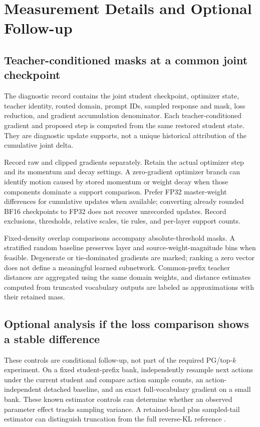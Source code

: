 \section{Measurement Details and Optional Follow-up}

\subsection{Teacher-conditioned masks at a common joint checkpoint}
\label{app:records}

The diagnostic record contains the joint student checkpoint, optimizer
state, teacher identity, routed domain, prompt IDs, sampled response
and mask, loss reduction, and gradient accumulation denominator.
Each teacher-conditioned gradient and proposed step is computed from
the same restored student state. They are diagnostic update supports,
not a unique historical attribution of the cumulative joint delta.

Record raw and clipped gradients separately. Retain the actual optimizer
step and its momentum and decay settings. A zero-gradient optimizer
branch can identify motion caused by stored momentum or weight decay
when those components dominate a support comparison. Prefer FP32
master-weight differences for cumulative updates when available;
converting already rounded BF16 checkpoints to FP32 does not recover
unrecorded updates. Record exclusions, thresholds, relative scales,
tie rules, and per-layer support counts.

Fixed-density overlap comparisons accompany absolute-threshold masks.
A stratified random baseline preserves layer and source-weight-magnitude
bins when feasible. Degenerate or tie-dominated gradients are marked;
ranking a zero vector does not define a meaningful learned subnetwork.
Common-prefix teacher distances are aggregated using the same domain
weights, and distance estimates computed from truncated vocabulary
outputs are labeled as approximations with their retained mass.

\subsection{Optional analysis if the loss comparison shows a stable difference}
\label{app:optional_loss}

These controls are conditional follow-up, not part of the required
PG/top-$k$ experiment. On a fixed student-prefix bank, independently
resample next actions under the current student and compare action
sample counts, an action-independent detached baseline, and an exact
full-vocabulary gradient on a small bank. These known estimator controls
can determine whether an observed parameter effect tracks sampling
variance. A retained-head plus sampled-tail estimator can distinguish
truncation from the full reverse-KL reference
\citep{oh2026vopd,zhang2026emapg,yu2026denseupdates}.

